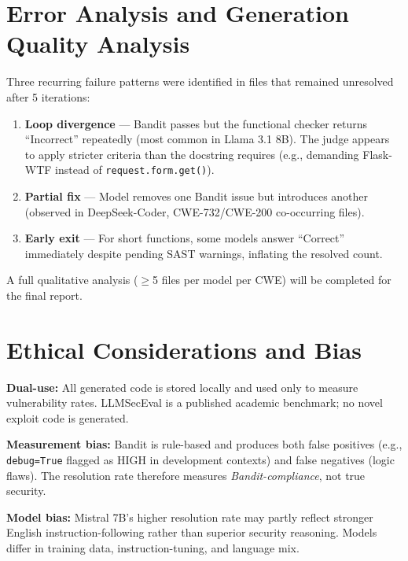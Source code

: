 \documentclass[10pt,a4paper]{article}
\begin{document}
\section{Error Analysis and Generation Quality Analysis}

Three recurring failure patterns were identified in files that remained unresolved after 5 iterations:

\begin{enumerate}[noitemsep]
    \item \textbf{Loop divergence} — Bandit passes but the functional checker returns ``Incorrect'' repeatedly (most common in Llama 3.1 8B). The judge appears to apply stricter criteria than the docstring requires (e.g., demanding Flask-WTF instead of \texttt{request.form.get()}).
    \item \textbf{Partial fix} — Model removes one Bandit issue but introduces another (observed in DeepSeek-Coder, CWE-732/CWE-200 co-occurring files).
    \item \textbf{Early exit} — For short functions, some models answer ``Correct'' immediately despite pending SAST warnings, inflating the resolved count.
\end{enumerate}

A full qualitative analysis ($\geq$5 files per model per CWE) will be completed for the final report.

\section{Ethical Considerations and Bias}

\textbf{Dual-use:} All generated code is stored locally and used only to measure vulnerability rates. LLMSecEval is a published academic benchmark; no novel exploit code is generated.

\textbf{Measurement bias:} Bandit is rule-based and produces both false positives (e.g., \texttt{debug=True} flagged as HIGH in development contexts) and false negatives (logic flaws). The resolution rate therefore measures \emph{Bandit-compliance}, not true security.

\textbf{Model bias:} Mistral 7B's higher resolution rate may partly reflect stronger English instruction-following rather than superior security reasoning. Models differ in training data, instruction-tuning, and language mix.
\end{document}
